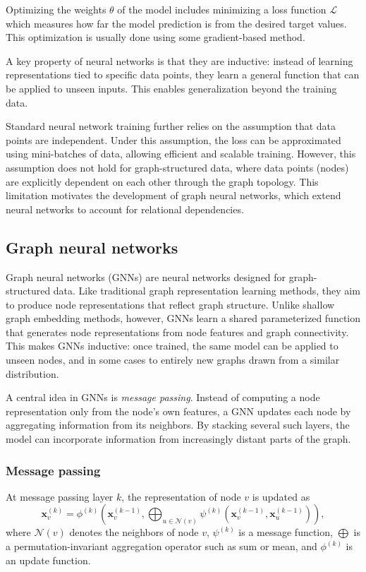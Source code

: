 \documentclass[PhD]{uclathes}
\begin{document}
Optimizing the weights $\theta$ of the model includes minimizing a loss
function $\mathcal{L}$ which measures how far the model prediction is from the
desired target values. This optimization is usually done using some
gradient-based method.

A key property of neural networks is that they are inductive: instead of
learning representations tied to specific data points, they learn a general
function that can be applied to unseen inputs. This enables generalization
beyond the training data.

Standard neural network training further relies on the assumption that data
points are independent. Under this assumption, the loss can be approximated
using mini-batches of data, allowing efficient and scalable training. However,
this assumption does not hold for graph-structured data, where data points
(nodes) are explicitly dependent on each other through the graph topology. This
limitation motivates the development of graph neural networks, which extend
neural networks to account for relational dependencies.

\subsection{Graph neural networks}
Graph neural networks (GNNs) are neural networks designed for graph-structured
data. Like traditional graph representation learning methods, they aim to
produce node representations that reflect graph structure. Unlike shallow graph
embedding methods, however, GNNs learn a shared parameterized function that
generates node representations from node features and graph connectivity. This
makes GNNs inductive: once trained, the same model can be applied to unseen
nodes, and in some cases to entirely new graphs drawn from a similar
distribution.

A central idea in GNNs is \emph{message passing}. Instead of computing a node
representation only from the node's own features, a GNN updates each node by
aggregating information from its neighbors. By stacking several such layers, the
model can incorporate information from increasingly distant parts of the graph.

\subsubsection{Message passing}
At message passing layer $k$, the representation of node $v$ is updated as
\[
\mathbf{x}_v^{(k)} =
\phi^{(k)}\!\left(
\mathbf{x}_v^{(k-1)},
\bigoplus_{u \in \mathcal{N}(v)}
\psi^{(k)}\!\left(\mathbf{x}_v^{(k-1)}, \mathbf{x}_u^{(k-1)}\right)
\right),
\]
where $\mathcal{N}(v)$ denotes the neighbors of node $v$, $\psi^{(k)}$ is a
message function, $\bigoplus$ is a permutation-invariant aggregation operator
such as sum or mean, and $\phi^{(k)}$ is an update function.
\end{document}
